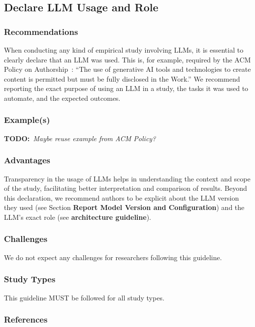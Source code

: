 \documentclass[11pt]{article}
\newcommand{\todo}[1]{{\textbf{TODO:}\ \textit{#1}}} %
\begin{document}
\subsection{Declare LLM Usage and Role}

\subsubsection{Recommendations}

When conducting any kind of empirical study involving LLMs, it is essential to clearly declare that an LLM was used.
This is, for example, required by the ACM Policy on Authorship~\cite{ACM2023}: ``The use of generative AI tools and technologies to create content is permitted but must be fully disclosed in the Work.''
We recommend reporting the exact purpose of using an LLM in a study, the tasks it was used to automate, and the expected outcomes.


\subsubsection{Example(s)}

\todo{Maybe reuse example from ACM Policy?}


\subsubsection{Advantages}

Transparency in the usage of LLMs helps in understanding the context and scope of the study, facilitating better interpretation and comparison of results.
Beyond this declaration, we recommend authors to be explicit about the LLM version they used (see Section \textbf{Report Model Version and Configuration}) and the LLM's exact role (see \textbf{architecture guideline}).


\subsubsection{Challenges}

We do not expect any challenges for researchers following this guideline.


\subsubsection{Study Types}

This guideline MUST be followed for all study types.


\subsubsection{References}



\end{document}
